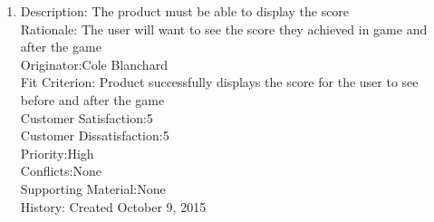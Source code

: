 \documentclass[12pt]{article}
\begin{document}
\begin{enumerate}
 \item Description: The product must be able to display the score\\
 Rationale: The user will want to see the score they achieved in game and after the game\\
 Originator:Cole Blanchard\\
 Fit Criterion: Product successfully displays the score for the user to see before and after the game \\
 Customer Satisfaction:5\\
 Customer Dissatisfaction:5\\
 Priority:High\\
 Conflicts:None\\
 Supporting Material:None\\
 History: Created October 9, 2015\\
 
\end{enumerate}
\end{document}

